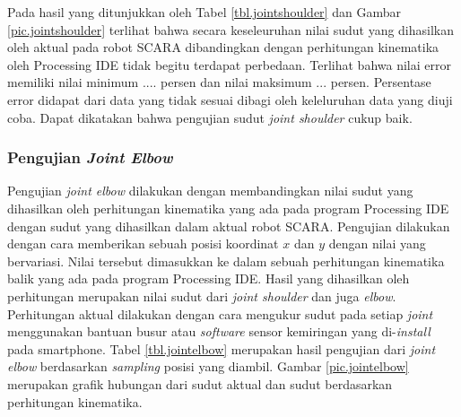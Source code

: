 Pada hasil yang ditunjukkan oleh Tabel \ref{tbl.jointshoulder} dan Gambar \ref{pic.jointshoulder} terlihat bahwa secara keseleuruhan nilai sudut yang dihasilkan oleh aktual pada robot SCARA dibandingkan dengan perhitungan kinematika oleh Processing IDE tidak begitu terdapat perbedaan. Terlihat bahwa nilai error
 memiliki nilai minimum .... persen dan nilai maksimum ... persen. Persentase error didapat dari data yang tidak sesuai dibagi oleh keleluruhan data yang diuji coba. Dapat dikatakan bahwa pengujian sudut \textit{joint shoulder} cukup baik.
 
 \subsubsection{Pengujian \textit{Joint Elbow}}
 Pengujian \textit{joint elbow} dilakukan dengan membandingkan nilai sudut yang dihasilkan oleh perhitungan kinematika yang ada pada program Processing IDE dengan sudut yang dihasilkan dalam aktual robot SCARA. Pengujian dilakukan dengan cara memberikan sebuah posisi koordinat $x$ dan $y$ dengan nilai yang bervariasi. Nilai tersebut dimasukkan ke dalam sebuah perhitungan kinematika balik yang ada pada program Processing IDE. Hasil yang dihasilkan oleh perhitungan merupakan nilai sudut dari \textit{joint shoulder} dan juga \textit{elbow}. Perhitungan aktual dilakukan dengan cara mengukur sudut pada setiap \textit{joint} menggunakan bantuan busur atau \textit{software} sensor kemiringan yang di-\textit{install} pada smartphone. Tabel \ref{tbl.jointelbow} merupakan hasil pengujian dari \textit{joint elbow} berdasarkan \textit{sampling} posisi yang diambil. Gambar \ref{pic.jointelbow} merupakan grafik hubungan dari sudut aktual dan sudut berdasarkan perhitungan kinematika. 
 
